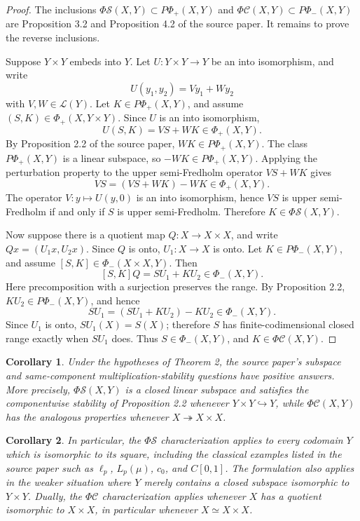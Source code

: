 \documentclass[11pt]{article}
\newtheorem{corollary}{Corollary}
\newcommand{\LL}{\mathcal L}
\newcommand{\PhiS}{\Phi\mathcal S}
\newcommand{\PhiC}{\Phi\mathcal C}
\newcommand{\PhiPlus}{\Phi_+}
\newcommand{\PhiMinus}{\Phi_-}
\begin{document}
\begin{proof}
The inclusions \(\PhiS(X,Y)\subset P\Phi_+(X,Y)\) and
\(\PhiC(X,Y)\subset P\Phi_-(X,Y)\) are Proposition 3.2 and Proposition 4.2 of
the source paper.  It remains to prove the reverse inclusions.

Suppose \(Y\times Y\) embeds into \(Y\).  Let
\(U:Y\times Y\to Y\) be an into isomorphism, and write
\[
U(y_1,y_2)=Vy_1+Wy_2
\]
with \(V,W\in\LL(Y)\).  Let \(K\in P\Phi_+(X,Y)\), and assume
\((S,K)\in\PhiPlus(X,Y\times Y)\).  Since \(U\) is an into isomorphism,
\[
U(S,K)=VS+WK\in\PhiPlus(X,Y).
\]
By Proposition 2.2 of the source paper, \(WK\in P\Phi_+(X,Y)\).  The class
\(P\Phi_+(X,Y)\) is a linear subspace, so \(-WK\in P\Phi_+(X,Y)\).  Applying
the perturbation property to the upper semi-Fredholm operator \(VS+WK\) gives
\[
VS=(VS+WK)-WK\in\PhiPlus(X,Y).
\]
The operator \(V:y\mapsto U(y,0)\) is an into isomorphism, hence \(VS\) is
upper semi-Fredholm if and only if \(S\) is upper semi-Fredholm.  Therefore
\(K\in\PhiS(X,Y)\).

Now suppose there is a quotient map \(Q:X\to X\times X\), and write
\(Qx=(U_1x,U_2x)\).  Since \(Q\) is onto, \(U_1:X\to X\) is onto.  Let
\(K\in P\Phi_-(X,Y)\), and assume
\([S,K]\in\PhiMinus(X\times X,Y)\).  Then
\[
[S,K]Q=SU_1+KU_2\in\PhiMinus(X,Y).
\]
Here precomposition with a surjection preserves the range.  By Proposition
2.2, \(KU_2\in P\Phi_-(X,Y)\), and hence
\[
SU_1=(SU_1+KU_2)-KU_2\in\PhiMinus(X,Y).
\]
Since \(U_1\) is onto, \(SU_1(X)=S(X)\); therefore \(S\) has
finite-codimensional closed range exactly when \(SU_1\) does.  Thus
\(S\in\PhiMinus(X,Y)\), and \(K\in\PhiC(X,Y)\).
\end{proof}

\begin{corollary}
Under the hypotheses of Theorem 2, the source paper's subspace and
same-component multiplication-stability questions have positive answers.  More
precisely, \(\PhiS(X,Y)\) is a closed linear subspace and satisfies the
componentwise stability of Proposition 2.2 whenever \(Y\times Y\hookrightarrow
Y\), while \(\PhiC(X,Y)\) has the analogous properties whenever
\(X\twoheadrightarrow X\times X\).
\end{corollary}

\begin{corollary}
In particular, the \(\PhiS\) characterization applies to every codomain
\(Y\) which is isomorphic to its square, including the classical examples
listed in the source paper such as \(\ell_p\), \(L_p(\mu)\), \(c_0\), and
\(C[0,1]\).  The formulation also applies in the weaker situation where
\(Y\) merely contains a closed subspace isomorphic to \(Y\times Y\).  Dually,
the \(\PhiC\) characterization applies whenever \(X\) has a quotient
isomorphic to \(X\times X\), in particular whenever \(X\simeq X\times X\).
\end{corollary}
\end{document}
